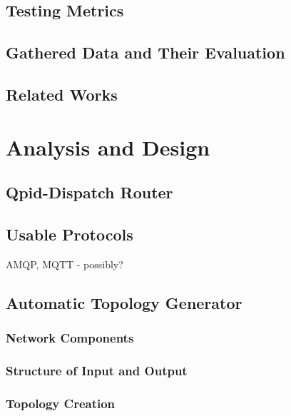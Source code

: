 \section{Testing Metrics}
\label{Testing Metrics}

\section{Gathered Data and Their Evaluation}
\label{Gathered Data and Their Evaluation}

\section{Related Works}
\label{Related Works}

\chapter{Analysis and Design}
\label{Analysis and Design}

\section{Qpid-Dispatch Router}

\section{Usable Protocols}
AMQP, MQTT - possibly?

\section{Automatic Topology Generator}

\subsection{Network Components}

\subsection{Structure of Input and Output}

\subsection{Topology Creation}

